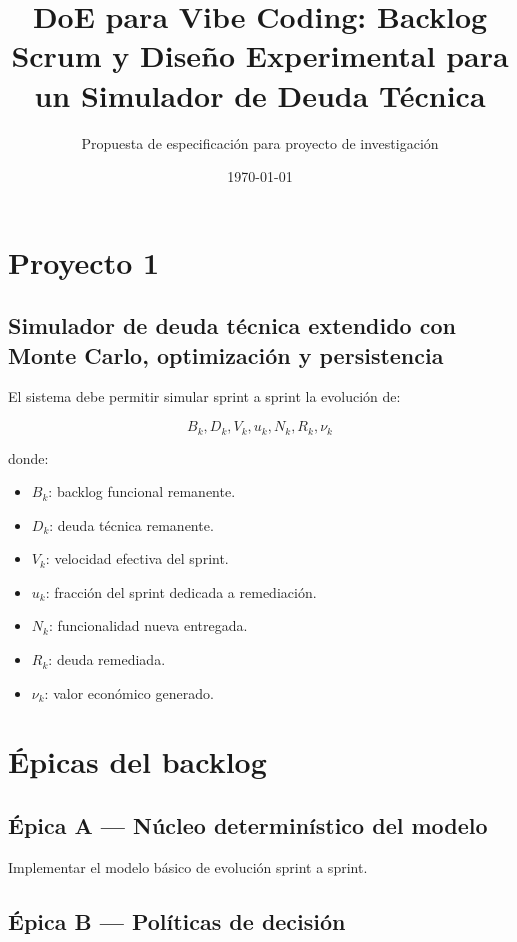 \documentclass[11pt,a4paper]{article}
\title{DoE para Vibe Coding: Backlog Scrum y Diseño Experimental para un Simulador de Deuda T\'ecnica}
\author{Propuesta de especificaci\'on para proyecto de investigaci\'on}
\date{\today}
\begin{document}
\maketitle

\section{Proyecto 1}

\subsection{Simulador de deuda t\'ecnica extendido con Monte Carlo, optimizaci\'on y persistencia}

El sistema debe permitir simular sprint a sprint la evoluci\'on de:

\begin{equation}
B_k, D_k, V_k, u_k, N_k, R_k, \nu_k
\end{equation}

donde:

\begin{itemize}[leftmargin=*]
    \item $B_k$: backlog funcional remanente.
    \item $D_k$: deuda t\'ecnica remanente.
    \item $V_k$: velocidad efectiva del sprint.
    \item $u_k$: fracci\'on del sprint dedicada a remediaci\'on.
    \item $N_k$: funcionalidad nueva entregada.
    \item $R_k$: deuda remediada.
    \item $\nu_k$: valor econ\'omico generado.
\end{itemize}

\section{\'Epicas del backlog}

\subsection{\'Epica A --- N\'ucleo determin\'istico del modelo}

Implementar el modelo b\'asico de evoluci\'on sprint a sprint.

\subsection{\'Epica B --- Pol\'iticas de decisi\'on}
\end{document}
